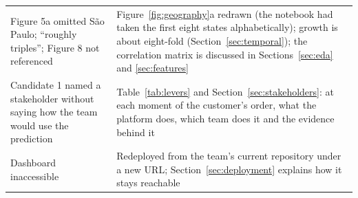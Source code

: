 \begin{center}
\begin{minipage}{\linewidth}
\begin{tabular}{@{}p{4.4cm}p{10.1cm}@{}}
Figure 5a omitted S\~{a}o Paulo; ``roughly triples''; Figure 8 not referenced &
Figure~\ref{fig:geography}a redrawn (the notebook had taken the first eight
states alphabetically); growth is about eight-fold
(Section~\ref{sec:temporal}); the correlation matrix is discussed in
Sections~\ref{sec:eda} and \ref{sec:features} \\[2pt]
Candidate 1 named a stakeholder without saying how the team would use the
prediction &
Table~\ref{tab:levers} and Section~\ref{sec:stakeholders}: at each moment of the
customer's order, what the platform does, which team does it and the evidence
behind it \\[2pt]
Dashboard inaccessible &
Redeployed from the team's current repository under a new URL;
Section~\ref{sec:deployment} explains how it stays reachable \\
\bottomrule
\end{tabular}
\end{minipage}
\end{center}


